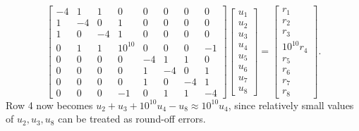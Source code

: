 \documentclass{article}
\numberwithin{equation}{section}
\begin{document}
\begin{equation}
\left[
\begin{array}{ccc|c|cccc}
-4 & 1 & 1 & 0 & 0 & 0 & 0 & 0 \\
1 & -4 & 0 & 1 & 0 & 0 & 0 & 0 \\
1 & 0 & -4 & 1 & 0 & 0 & 0 & 0 \\
\hline
0 & 1 & 1 & 10^{10} & 0 & 0 & 0 & -1 \\
\hline
0 & 0 & 0 & 0 & -4 & 1 & 1 & 0 \\
0 & 0 & 0 & 0 & 1 & -4 & 0 & 1 \\
0 & 0 & 0 & 0 & 1 & 0 & -4 & 1 \\
0 & 0 & 0 & -1 & 0 & 1 & 1 & -4
\end{array}
\right]
\left[
\begin{array}{c}
u_1\\
u_2\\
u_3\\
u_4\\
u_5\\
u_6\\
u_7\\
u_8
\end{array}
\right]
=\left[
\begin{array}{c}
r_1\\
r_2\\
r_3\\
10^{10}r_4\\
r_5\\
r_6\\
r_7\\
r_8
\end{array}
\right].
\end{equation}
Row 4 now becomes
$u_2+u_3+10^{10}u_4-u_8\approx 10^{10} u_4$, since relatively small values of $u_2,u_3,u_8$ can be treated as round-off errors.  

\end{document}
